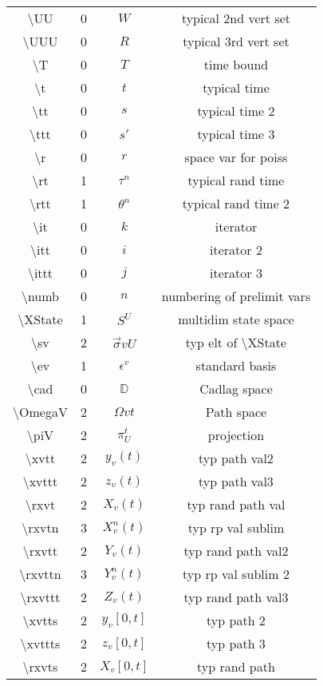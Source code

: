 \documentclass[12pt]{article}
\newcommand{\mb}{\mathbb}
\newcommand{\ep}{\epsilon}
\newcommand{\tbs}{\textbackslash}
\newcommand{\cad}{\mb{D}}							%
\renewcommand{\v}{v}							%
\renewcommand{\U}{U}							%
\newcommand{\UU}{W}								%
\newcommand{\UUU}{R}							%
\renewcommand{\S}{S}							%
\newcommand{\s}{\sigma}							%
\newcommand{\sv}{\vec{\s}}						%
\newcommand{\ev}[1]{\ep^{#1}}					%
\newcommand{\T}{T}								%
\renewcommand{\t}{t}							%
\renewcommand{\tt}{s}							%
\newcommand{\ttt}{s'}							%
\renewcommand{\r}{r}								%
\newcommand{\rt}[1]{\tau^{#1}}						%
\newcommand{\rtt}[1]{\theta^{#1}}					%
\renewcommand{\it}{k}								%
\newcommand{\itt}{i}								%
\newcommand{\ittt}{j}								%
\newcommand{\numb}{n}								%
\newcommand{\XState}[1]{\S^{#1}}				%
\newcommand{\piV}[2]{\pi_{#1}^{#2}}					%
\newcommand{\xvtt}[2]{y_{#1}{(#2)}}					%
\newcommand{\xvttt}[2]{z_{#1}{(#2)}}				%
\newcommand{\rxvt}[2]{X_{#1}{(#2)}}					%
\newcommand{\rxvtn}[3]{X_{#1}^{#3}(#2)}				%
\newcommand{\rxvtt}[2]{Y_{#1}{(#2)}}				%
\newcommand{\rxvttn}[3]{Y_{#1}^{#3}(#2)}			%
\newcommand{\rxvttt}[2]{Z_{#1}{(#2)}}				%
\newcommand{\xvtts}[2]{y_{#1}{#2}}					%
\newcommand{\xvttts}[2]{z_{#1}{#2}}					%
\newcommand{\rxvts}[2]{X_{#1}{#2}}					%
\begin{document}
\begin{longtable}{c|c|c|c}
\tbs UU&0&\(\UU\)								&typical 2nd vert set\\
\tbs UUU&0&\(\UUU\)								&typical 3rd vert set\\
\tbs T&0&\(\T\)									&time bound\\
\tbs t&0&\(\t\)								&typical time\\
\tbs tt&0&\(\tt\)								&typical time 2\\
\tbs ttt&0&\(\ttt\)							&typical time 3\\
\tbs r&0&\(\r\)								&space var for poiss\\
\tbs rt&1&\(\rt{\numb}\)					&typical rand time\\
\tbs rtt&1&\(\rtt{\numb}\)					&typical rand time 2\\
\tbs it&0& \(\it\)							&iterator\\
\tbs itt&0&\(\itt\)							&iterator 2\\
\tbs ittt&0&\(\ittt\)						&iterator 3\\
\tbs numb&0&\(\numb\)						&numbering of prelimit vars\\
\tbs XState&1&\(\XState{\U}\)				&multidim state space\\
\tbs sv&2&\(\sv{\v}{\U}\)					&typ elt of \tbs XState\\
\tbs ev&1&\(\ev{\v}\)						&standard basis\\
\tbs cad&0&\(\cad\)							&Cadlag space\\
\tbs OmegaV&2&\(\Omega{\v}{\t}\)			&Path space\\
\tbs piV&2&\(\piV{\U}{t}\)					&projection\\
\tbs xvtt&2&\(\xvtt{\v}{\t}\)					&typ path val2\\
\tbs xvttt&2&\(\xvttt{\v}{\t}\)				&typ path val3\\
\tbs rxvt&2&\(\rxvt{\v}{\t}\)					&typ rand path val\\
\tbs rxvtn&3&\(\rxvtn{\v}{\t}{\numb}\)		&typ rp val sublim\\
\tbs rxvtt&2&\(\rxvtt{\v}{\t}\)				&typ rand path val2\\
\tbs rxvttn&3&\(\rxvttn{\v}{\t}{\numb}\)		&typ rp val sublim 2\\
\tbs rxvttt&2&\(\rxvttt{\v}{\t}\)				&typ rand path val3\\
\tbs xvtts&2&\(\xvtts{\v}{[0,\t]}\)					&typ path 2\\
\tbs xvttts&2&\(\xvttts{\v}{[0,\t]}\)					&typ path 3\\
\tbs rxvts&2&\(\rxvts{\v}{[0,\t]}\)					&typ rand path\\

\end{longtable}
\end{document}
